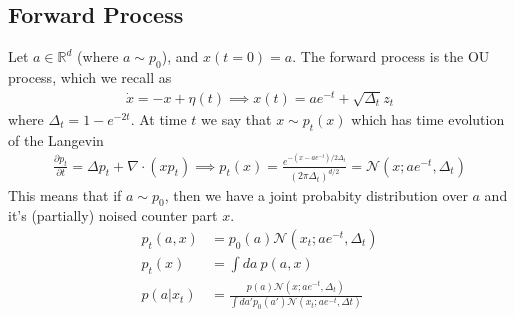 \subsection{Forward Process}
Let $a \in \mathbb R^d$ (where $a \sim p_0$), and $x(t=0) = a$. The forward process is the OU process, which we recall as 
\begin{align}
	\dot x = -x + \eta(t) \implies x(t) = a e^{-t} + \sqrt{\Delta_t} z_t
\end{align}
where $\Delta_t = 1 - e^{-2t}$.
At time $t$ we say that $x \sim p_t(x)$ which has time evolution of the Langevin
\begin{align}
	\frac{\partial p_t}{\partial t} = \Delta p_t + \nabla \cdot (x p_t) \implies p_t(x) = \frac{e^{-(x-ae^{-t})/2\Delta_t}}{(2\pi \Delta_t)^{d/2}} =  \mathcal N(x; a e^{-t}, \Delta_t)
\end{align}
This means that if $a \sim p_0$, then we have a joint probabity distribution over $a$ and it's (partially) noised counter part $x$.
\begin{align}
	p_t(a,x) &= p_0(a) \mathcal N(x_t; ae^{-t} , \Delta_t)\\
	p_t(x) &= \int da ~ p(a,x)\\
	p(a | x_t) &= \frac{p(a)  \mathcal N(x; ae^{-t} , \Delta_t)}{\int d a' p_0(a') \mathcal N(x_t; a e^{-t}, \Delta t)}
\end{align}

